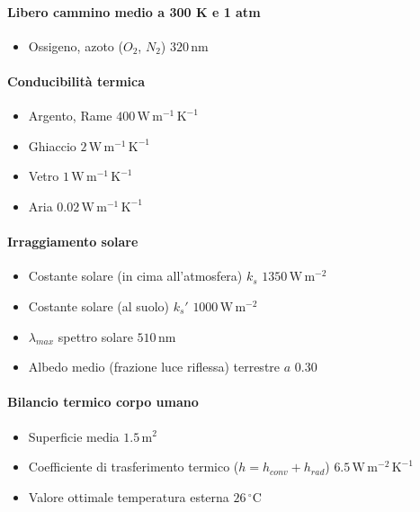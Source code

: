 \documentclass[10pt, oneside]{article}
\begin{document}
\paragraph{Libero cammino medio a 300 K e 1 atm}
\begin{itemize}
\item Ossigeno, azoto ($O_2$, $N_2$) \dotfill $ 320 \, \mathrm{nm}$ 
\end{itemize}
\paragraph{Conducibilità termica}
\begin{itemize}
\item Argento, Rame \dotfill $ 400 \, \mathrm{W \, m^{-1} \, K^{-1}}$ 

\item Ghiaccio \dotfill $ 2 \, \mathrm{W \, m^{-1} \, K^{-1}}$ 

\item Vetro \dotfill $ 1 \, \mathrm{W \, m^{-1} \, K^{-1}}$ 

\item Aria \dotfill $ 0.02 \, \mathrm{W \, m^{-1} \, K^{-1}}$ 
\end{itemize}

\paragraph{Irraggiamento solare}
\begin{itemize}
\item Costante solare (in cima all'atmosfera) $k_s$ \dotfill $ 1350 \, \mathrm{W \, m^{-2}}$ 
\item Costante solare (al suolo) $k_s'$ \dotfill $ 1000 \, \mathrm{W \, m^{-2}}$ 
\item $\lambda_{max}$ spettro solare \dotfill $ 510 \, \mathrm{nm}$ 
\item Albedo medio (frazione luce riflessa) terrestre $a$ \dotfill $ 0.30$ 
\end{itemize}
\paragraph{Bilancio termico corpo umano}
\begin{itemize}
\item Superficie media \dotfill $ 1.5 \, \mathrm{m^2}$ 
\item Coefficiente di trasferimento termico ($h = h_{conv} + h_{rad}$) \dotfill $ 6.5 \, \mathrm{W \, m^{-2} \, K^{-1}}$ 
\item Valore ottimale temperatura esterna \dotfill $ 26 \, \mathrm{{}^\circ C}$ 
\end{itemize}
\end{document}
